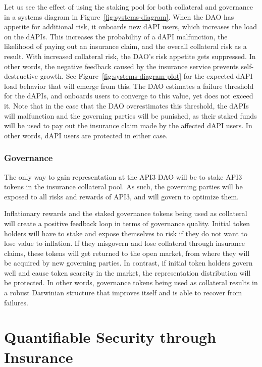 \documentclass[11pt]{article}
\begin{document}
Let us see the effect of using the staking pool for both collateral and governance in a systems diagram in Figure~\ref{fig:systems-diagram}.
When the DAO has appetite for additional risk, it onboards new dAPI users, which increases the load on the dAPIs.
This increases the probability of a dAPI malfunction, the likelihood of paying out an insurance claim, and the overall collateral risk as a result.
With increased collateral risk, the DAO’s risk appetite gets suppressed.
In other words, the negative feedback caused by the insurance service prevents self-destructive growth.
See Figure~\ref{fig:systems-diagram-plot} for the expected dAPI load behavior that will emerge from this.
The DAO estimates a failure threshold for the dAPIs, and onboards users to converge to this value, yet does not exceed it.
Note that in the case that the DAO overestimates this threshold, the dAPIs will malfunction and the governing parties will be punished, as their staked funds will be used to pay out the insurance claim made by the affected dAPI users.
In other words, dAPI users are protected in either case.

\subsubsection{Governance}
\label{sec:governance}

The only way to gain representation at the API3 DAO will be to stake API3 tokens in the insurance collateral pool.
As such, the governing parties will be exposed to all risks and rewards of API3, and will govern to optimize them.

Inflationary rewards and the staked governance tokens being used as collateral will create a positive feedback loop in terms of governance quality.
Initial token holders will have to stake and expose themselves to risk if they do not want to lose value to inflation.
If they misgovern and lose collateral through insurance claims, these tokens will get returned to the open market, from where they will be acquired by new governing parties.
In contrast, if initial token holders govern well and cause token scarcity in the market, the representation distribution will be protected.
In other words, governance tokens being used as collateral results in a robust Darwinian structure that improves itself and is able to recover from failures.


\section{Quantifiable Security through Insurance}
\label{sec:quantifiable-security-through-insurance}
\end{document}
